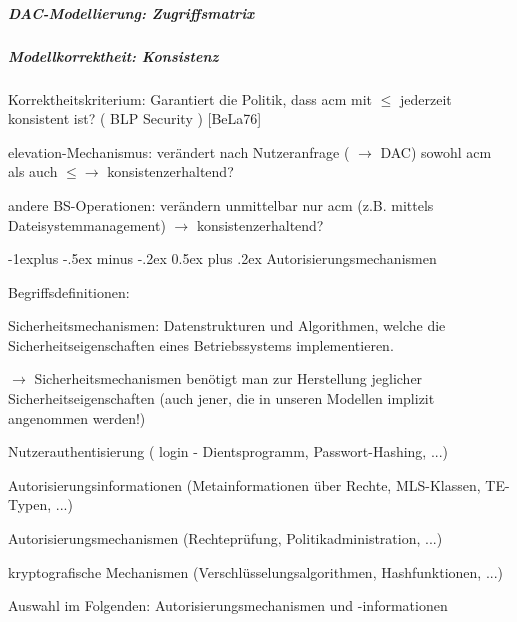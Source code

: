 \documentclass[a4paper]{article}
\makeatletter
\renewcommand{\subsection}{\@startsection{subsection}{2}{0mm}%
 {-1explus -.5ex minus -.2ex}%
 {0.5ex plus .2ex}%
 {\normalfont\normalsize\bfseries}}
\makeatother
\begin{document}
\begin{multicols}{3}
    \subparagraph{DAC-Modellierung:
        Zugriffsmatrix}



    \subparagraph{Modellkorrektheit:
        Konsistenz}

    \begin{itemize*}
        \item
        Korrektheitskriterium: Garantiert die Politik, dass acm mit
        $\leq$ jederzeit konsistent ist? ( BLP Security )
        [BeLa76]
        \item
        elevation-Mechanismus: verändert nach Nutzeranfrage
        ( $\rightarrow$ DAC) sowohl acm als auch
        $\leq\rightarrow$ konsistenzerhaltend?
        \item
        andere BS-Operationen: verändern unmittelbar nur acm (z.B. mittels
        Dateisystemmanagement) $\rightarrow$
        konsistenzerhaltend?
    \end{itemize*}


    \subsection{Autorisierungsmechanismen}

    Begriffsdefinitionen:

    \begin{itemize*}
        \item
        Sicherheitsmechanismen: Datenstrukturen und Algorithmen, welche die
        Sicherheitseigenschaften eines Betriebssystems implementieren.
        \begin{itemize*}
            \item $\rightarrow$ Sicherheitsmechanismen benötigt man zur Herstellung jeglicher Sicherheitseigenschaften (auch jener, die in unseren Modellen implizit angenommen werden!)
            \item Nutzerauthentisierung ( login - Dientsprogramm, Passwort-Hashing, ...)
            \item Autorisierungsinformationen (Metainformationen über Rechte, MLS-Klassen, TE-Typen, ...)
            \item Autorisierungsmechanismen (Rechteprüfung, Politikadministration, ...)
            \item kryptografische Mechanismen (Verschlüsselungsalgorithmen, Hashfunktionen, ...)
        \end{itemize*}
        \item
        Auswahl im Folgenden: Autorisierungsmechanismen und -informationen
    \end{itemize*}



\end{multicols}
\end{document}
